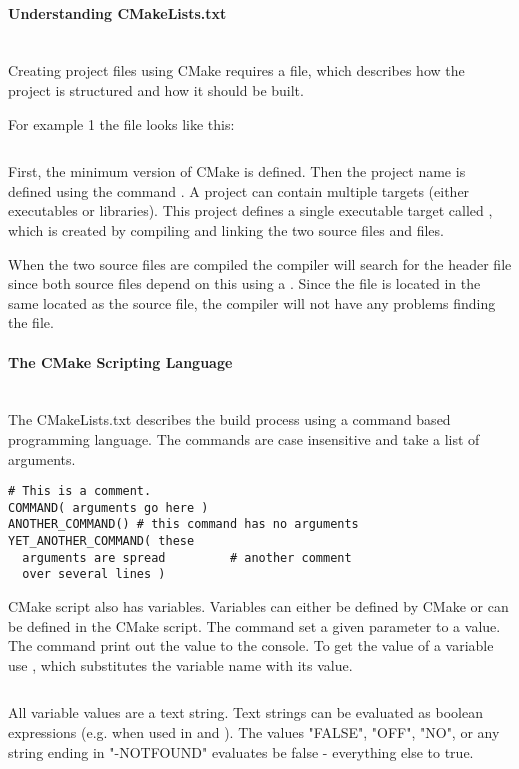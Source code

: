 \documentclass[11pt,letter,landscape]{scrartcl} %
\newcommand{\sectiontitle}[1]{\paragraph{#1} \ \\} %
\begin{document}
\begin{multicols}{2}
\sectiontitle{Understanding CMakeLists.txt}

Creating project files using CMake requires a  file, which describes how the project is structured and how it should be built.

For example 1 the file looks like this:

\inputminted{cmake}{examples/example1/CMakeLists.txt}

First, the minimum version of CMake is defined. Then the project name is defined using the command . A project can contain multiple targets (either executables or libraries). This project defines a single executable target called , which is created by compiling and linking the two source files  and  files.

When the two source files are compiled the compiler will search for the header file  since both source files depend on this using a . Since the file is located in the same located as the source file, the compiler will not have any problems finding the file.

\sectiontitle{The CMake Scripting Language}

The CMakeLists.txt describes the build process using a command based programming language. The commands are case insensitive and take a list of arguments.

\begin{verbatim}
# This is a comment.
COMMAND( arguments go here )
ANOTHER_COMMAND() # this command has no arguments
YET_ANOTHER_COMMAND( these
  arguments are spread         # another comment
  over several lines )
\end{verbatim}

CMake script also has variables. Variables can either be defined by CMake or can be defined in the CMake script.  The command  set a given parameter to a value. The command  print out the value to the console. To get the value of a variable use , which substitutes the variable name with its value.

\inputminted{cmake}{examples/example2/CMakeLists.txt}

All variable values are a text string. Text strings can be evaluated as boolean expressions (e.g. when used in  and ). The values "FALSE", "OFF", "NO", or any string ending in "-NOTFOUND" evaluates be false - everything else to true.


\end{multicols}
\end{document}
